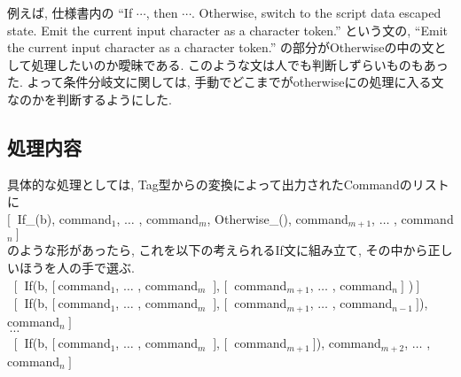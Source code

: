 \documentclass[uplatex,a4j]{jsreport}
\begin{document}
例えば, 仕様書内の 
``If $\cdots$, then $\cdots$. Otherwise, switch to the script data escaped state. Emit the current input character as a character token.''
という文の, ``Emit the current input character as a character token.'' の部分がOtherwiseの中の文として処理したいのか曖昧である. 
このような文は人でも判断しずらいものもあった. %
よって条件分岐文に関しては, 手動でどこまでがotherwiseにの処理に入る文なのかを判断するようにした. 
\subsection*{処理内容}
具体的な処理としては, 
Tag型からの変換によって出力されたCommandのリストに \\
$[\ $ If_(b), command$_1$, $\ldots$ , command$_m$, Otherwise_(), command$_{m+1}$, $\ldots$ , command$_n \ ]$\\
のような形があったら, これを以下の考えられるIf文に組み立て, その中から正しいほうを人の手で選ぶ. \\
$\ $ $[\ $ If(b, $[\ $command$_1$, $\ldots$ , command$_m$ $ \ ]$, $[\ $ command$_{m+1}$, $\ldots$ , command$_n \ ]$ )$\ ]$\\
$\ $ $[\ $ If(b, $[\ $command$_1$, $\ldots$ , command$_m$ $ \ ]$, $[\ $ command$_{m+1}$, $\ldots$ , command$_{n-1} \ ]$), command$_n \ ]$ \\
$\ \cdots$\\
$\ $ $[\ $ If(b, $[\ $command$_1$, $\ldots$ , command$_m$ $ \ ]$, $[\ $ command$_{m+1}\ ]$), command$_{m+2}$, $\ldots$ , command$_n \ ]$ 
\end{document}
